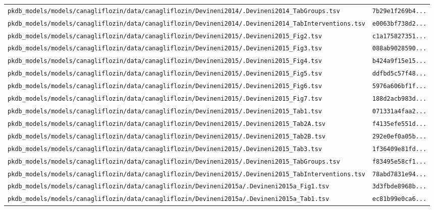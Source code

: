 \documentclass{article}
\begin{document}
\begin{longtable}{ll}
\texttt{pkdb\_models/models/canagliflozin/data/canagliflozin/Devineni2014/.Devineni2014\_TabGroups.tsv} & \texttt{7b29e1f269b4...} \\
\texttt{pkdb\_models/models/canagliflozin/data/canagliflozin/Devineni2014/.Devineni2014\_TabInterventions.tsv} & \texttt{e0063bf738d2...} \\
\texttt{pkdb\_models/models/canagliflozin/data/canagliflozin/Devineni2015/.Devineni2015\_Fig2.tsv} & \texttt{c1a175827351...} \\
\texttt{pkdb\_models/models/canagliflozin/data/canagliflozin/Devineni2015/.Devineni2015\_Fig3.tsv} & \texttt{088ab9028590...} \\
\texttt{pkdb\_models/models/canagliflozin/data/canagliflozin/Devineni2015/.Devineni2015\_Fig4.tsv} & \texttt{b424a9f15e15...} \\
\texttt{pkdb\_models/models/canagliflozin/data/canagliflozin/Devineni2015/.Devineni2015\_Fig5.tsv} & \texttt{ddfbd5c57f48...} \\
\texttt{pkdb\_models/models/canagliflozin/data/canagliflozin/Devineni2015/.Devineni2015\_Fig6.tsv} & \texttt{5976a606bf1f...} \\
\texttt{pkdb\_models/models/canagliflozin/data/canagliflozin/Devineni2015/.Devineni2015\_Fig7.tsv} & \texttt{188d2acb983d...} \\
\texttt{pkdb\_models/models/canagliflozin/data/canagliflozin/Devineni2015/.Devineni2015\_Tab1.tsv} & \texttt{071331a4faa2...} \\
\texttt{pkdb\_models/models/canagliflozin/data/canagliflozin/Devineni2015/.Devineni2015\_Tab2A.tsv} & \texttt{f4135efe551d...} \\
\texttt{pkdb\_models/models/canagliflozin/data/canagliflozin/Devineni2015/.Devineni2015\_Tab2B.tsv} & \texttt{292e0ef0a05b...} \\
\texttt{pkdb\_models/models/canagliflozin/data/canagliflozin/Devineni2015/.Devineni2015\_Tab3.tsv} & \texttt{1f36409e81fd...} \\
\texttt{pkdb\_models/models/canagliflozin/data/canagliflozin/Devineni2015/.Devineni2015\_TabGroups.tsv} & \texttt{f83495e58cf1...} \\
\texttt{pkdb\_models/models/canagliflozin/data/canagliflozin/Devineni2015/.Devineni2015\_TabInterventions.tsv} & \texttt{78abd7831e94...} \\
\texttt{pkdb\_models/models/canagliflozin/data/canagliflozin/Devineni2015a/.Devineni2015a\_Fig1.tsv} & \texttt{3d3fbde8968b...} \\
\texttt{pkdb\_models/models/canagliflozin/data/canagliflozin/Devineni2015a/.Devineni2015a\_Tab1.tsv} & \texttt{ec81b99e0ca6...} \\

\end{longtable}
\end{document}
